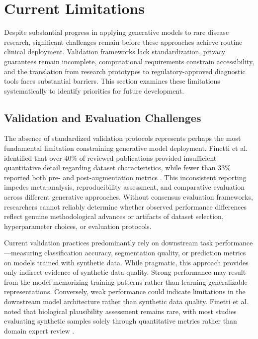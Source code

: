 \section{Current Limitations}
\label{sec:limitations}

Despite substantial progress in applying generative models to rare disease research, significant challenges remain before these approaches achieve routine clinical deployment. Validation frameworks lack standardization, privacy guarantees remain incomplete, computational requirements constrain accessibility, and the translation from research prototypes to regulatory-approved diagnostic tools faces substantial barriers. This section examines these limitations systematically to identify priorities for future development.

\subsection{Validation and Evaluation Challenges}

The absence of standardized validation protocols represents perhaps the most fundamental limitation constraining generative model deployment. Finetti et al. identified that over 40\% of reviewed publications provided insufficient quantitative detail regarding dataset characteristics, while fewer than 33\% reported both pre- and post-augmentation metrics \cite{finetti2025data}. This inconsistent reporting impedes meta-analysis, reproducibility assessment, and comparative evaluation across different generative approaches. Without consensus evaluation frameworks, researchers cannot reliably determine whether observed performance differences reflect genuine methodological advances or artifacts of dataset selection, hyperparameter choices, or evaluation protocols.

Current validation practices predominantly rely on downstream task performance—measuring classification accuracy, segmentation quality, or prediction metrics on models trained with synthetic data. While pragmatic, this approach provides only indirect evidence of synthetic data quality. Strong performance may result from the model memorizing training patterns rather than learning generalizable representations. Conversely, weak performance could indicate limitations in the downstream model architecture rather than synthetic data quality. Finetti et al. noted that biological plausibility assessment remains rare, with most studies evaluating synthetic samples solely through quantitative metrics rather than domain expert review \cite{finetti2025data}.

